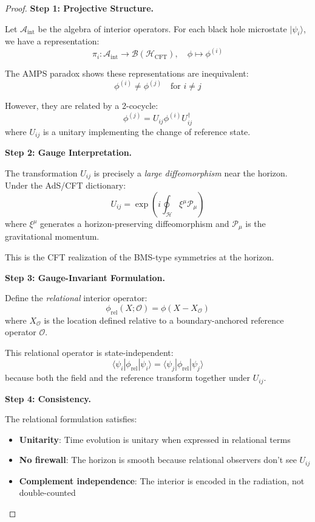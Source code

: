 \documentclass[12pt,a4paper]{article}
\begin{document}
\begin{proof}
\textbf{Step 1: Projective Structure.}

Let $\mathcal{A}_{\text{int}}$ be the algebra of interior operators. For each black hole microstate $|\psi_i\rangle$, we have a representation:
\begin{equation}
\pi_i: \mathcal{A}_{\text{int}} \to \mathcal{B}(\mathcal{H}_{\text{CFT}}), \quad \phi \mapsto \phi^{(i)}
\end{equation}

The AMPS paradox shows these representations are inequivalent:
\begin{equation}
\phi^{(i)} \neq \phi^{(j)} \quad \text{for } i \neq j
\end{equation}

However, they are related by a 2-cocycle:
\begin{equation}
\phi^{(j)} = U_{ij} \phi^{(i)} U_{ij}^\dagger
\end{equation}
where $U_{ij}$ is a unitary implementing the change of reference state.

\textbf{Step 2: Gauge Interpretation.}

The transformation $U_{ij}$ is precisely a \emph{large diffeomorphism} near the horizon. Under the AdS/CFT dictionary:
\begin{equation}
U_{ij} = \exp\left( i \oint_{\mathcal{H}} \xi^\mu \mathcal{P}_\mu \right)
\end{equation}
where $\xi^\mu$ generates a horizon-preserving diffeomorphism and $\mathcal{P}_\mu$ is the gravitational momentum.

This is the CFT realization of the BMS-type symmetries at the horizon.

\textbf{Step 3: Gauge-Invariant Formulation.}

Define the \emph{relational} interior operator:
\begin{equation}
\phi_{\text{rel}}(X; \mathcal{O}) = \phi(X - X_{\mathcal{O}})
\end{equation}
where $X_{\mathcal{O}}$ is the location defined relative to a boundary-anchored reference operator $\mathcal{O}$.

This relational operator is state-independent:
\begin{equation}
\langle\psi_i|\phi_{\text{rel}}|\psi_i\rangle = \langle\psi_j|\phi_{\text{rel}}|\psi_j\rangle
\end{equation}
because both the field and the reference transform together under $U_{ij}$.

\textbf{Step 4: Consistency.}

The relational formulation satisfies:
\begin{itemize}
    \item \textbf{Unitarity}: Time evolution is unitary when expressed in relational terms
    \item \textbf{No firewall}: The horizon is smooth because relational observers don't see $U_{ij}$
    \item \textbf{Complement independence}: The interior is encoded in the radiation, not double-counted
\end{itemize}
\end{proof}
\end{document}
